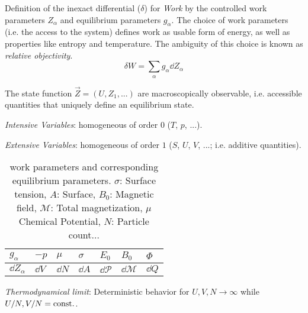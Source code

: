 			Definition of the inexact differential ($\delta$) for \emph{Work} by the controlled work parameters $Z_\alpha$ and equilibrium parameters $g_\alpha$.
			The choice of work parameters (i.e. the access to the system) defines work as usable form of energy, as well as properties like entropy and temperature. The ambiguity of this choice is known as \emph{relative objectivity}.
			\begin{equation}
				\delta W = \sum_\alpha g_\alpha \dd Z_\alpha
			\end{equation} \vsp

			The state function $\vec{Z}=\left(U, Z_1,... \right)$ are macroscopically observable, i.e. accessible quantities that uniquely define an equilibrium state. \vsp

			\emph{Intensive Variables}: homogeneous of order $0$ ($T$, $p$, ...). \vsp

			\emph{Extensive Variables}: homogeneous of order $1$ ($S$, $U$, $V$, ...; i.e. additive quantities). \vsp

			\begin{table}[ht]
				\begin{center}
				\begin{tabular}{ l | l l l l l l }
					$g_\alpha$ & $-p$ & $\mu$ & $\sigma$ & $E_0$ & $B_0$ & $\Phi$ \\ \hline
					$\dd Z_\alpha$ & $\dd V$ & $\dd N$ & $\dd A$ & $\dd \mathcal{P}$ & $\dd \mathcal{M}$ & $\dd Q$ \\
					\end{tabular}
				\caption{work parameters and corresponding equilibrium parameters. $\sigma$: Surface tension, $A$: Surface, $B_0$: Magnetic field, $\mathcal{M}$: Total magnetization, $\mu$ Chemical Potential, $N$: Particle count...}
				\label{tab:WorkParametersAndEquilibriumParameters}
				\end{center}
			\end{table} \vsp

			\noindent
			\emph{Thermodynamical limit}: \newline Deterministic behavior for $U,V,N\rightarrow\infty$ while $U/N,V/N=\mathrm{const.}$. \vsp


